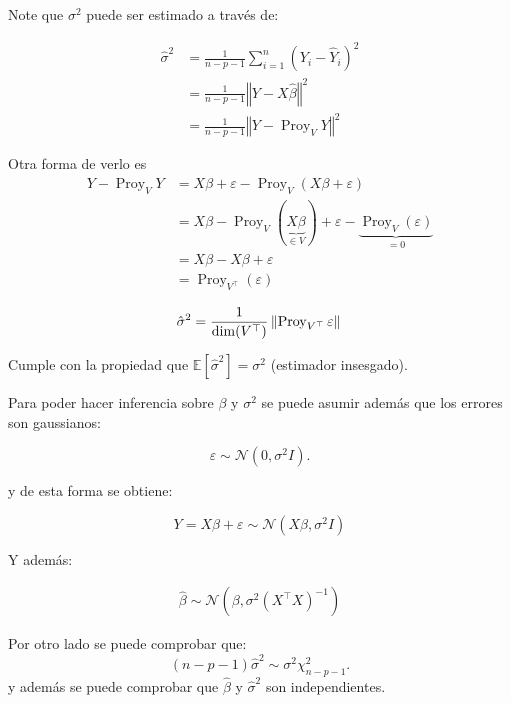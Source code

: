 \documentclass[
  12pt,
]{book}
\begin{document}
Note que \(\sigma^{2}\) puede ser estimado a través de:

\begin{align*}
 \hat{\sigma}^{2} 
 &=  \frac{1}{n-p-1} \sum_{i=1}^{n} \left( Y_{i} - \hat{Y}_{i}\right)^{2} \\
 &= \frac{1}{n-p-1}\left\Vert Y - X\hat{\beta} \right\Vert^{2} \\
 &=   \frac{1}{n-p-1} \left\Vert Y-\operatorname{Proy}_{V}Y \right\Vert^{2} 
 \end{align*}

Otra forma de verlo es \begin{align*}
Y-\operatorname{Proy}_{V}Y  
&= X\beta + \varepsilon -  \operatorname{Proy}_{V}( X\beta + \varepsilon) \\
&= X\beta - \operatorname{Proy}_{V}( \underbrace{X\beta}_{\in V}) + \varepsilon - \underbrace{\operatorname{Proy}_{V}( \varepsilon)}_{=0} \\
&= X\beta -X\beta + \varepsilon \\
&=  \operatorname{Proy}_{V^{\top}}( \varepsilon)
 \end{align*}

\begin{equation*}
\hat{\sigma}^{2} 
= \frac{1}{\operatorname{dim}(V^{\top})}\left\Vert \operatorname{Proy}_{V^{\top}}\varepsilon\right\Vert \\
\end{equation*}

Cumple con la propiedad que
\(\mathbb{E}\left[\hat{\sigma}^{2}\right] = \sigma^{2}\) (estimador
insesgado).

Para poder hacer inferencia sobre \(\beta\) y \(\sigma^2\) se puede
asumir además que los errores son gaussianos:

\begin{equation*}
\varepsilon\sim \mathcal{N}\left(0,\sigma^{2}I\right).
\end{equation*}

y de esta forma se obtiene:

\begin{equation*}
Y = X\beta + \varepsilon \sim \mathcal{N}\left(X\beta,\sigma^{2}I\right)
\end{equation*}

Y además:

\begin{align*}
\hat{\beta} \sim  \mathcal{N}\left(\beta,\sigma^2 (X^{\top}X)^{-1}\right) 
\end{align*}

Por otro lado se puede comprobar que:
\[(n-p-1)\hat{\sigma}^{2} \sim \sigma^{2} \chi^{2}_{n-p-1}.\] y además
se puede comprobar que \(\hat \beta\) y \(\hat \sigma^2\) son
independientes.
\end{document}
